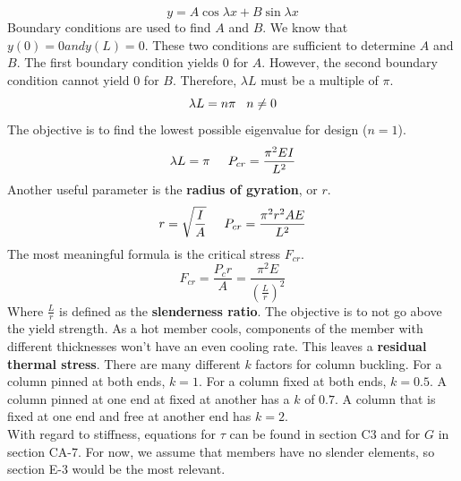 \documentclass{article}
\begin{document}
\[y=A\cos \lambda x+B\sin \lambda x\] 
Boundary conditions are used to find $A$ and $B$. We know that $y(0)=0 and y(L)=0$. These two conditions are sufficient to determine $A$ and $B$. The first boundary condition yields 0 for $A$. However, the second boundary condition cannot yield 0 for $B$. Therefore, $\lambda L$ must be a multiple of $\pi$. 
\[\lambda L = n\pi \hspace{3mm}n\neq0\]
The objective is to find the lowest possible eigenvalue for design ($n=1$). 
\[\lambda L = \pi\hspace{5mm}P_{cr}=\frac{\pi^2EI}{L^2}\] 
Another useful parameter is the \textbf{radius of gyration}, or $r$. 
\[r=\sqrt{\frac{I}{A}}\hspace{5mm}P_{cr}=\frac{\pi^2r^2AE}{L^2}\]
The most meaningful formula is the critical stress $F_{cr}$. 
\[F_{cr}=\frac{P_cr}{A}=\frac{\pi^2E}{\left(\frac{L}{r}\right)^2}\] 
Where $\frac{L}{r}$ is defined as the \textbf{slenderness ratio}. The objective is to not go above the yield strength. As a hot member cools, components of the member with different thicknesses won't have an even cooling rate. This leaves a \textbf{residual thermal stress}. There are many different $k$ factors for column buckling. For a column pinned at both ends, $k=1$. For a column fixed at both ends, $k=0.5$. A column pinned at one end at fixed at another has a $k$ of $0.7$. A column that is fixed at one end and free at another end has $k=2$.\\
With regard to stiffness, equations for $\tau$ can be found in section C3 and for $G$ in section CA-7. For now, we assume that members have no slender elements, so section E-3 would be the most relevant.
\end{document}
